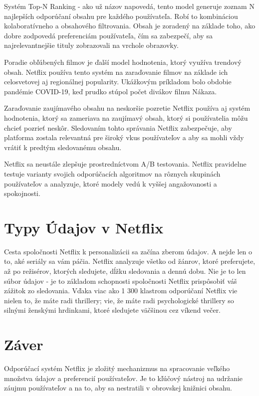 \documentclass[10pt,slovak,a4paper]{article}
\begin{document}
Systém Top-N Ranking - ako už názov napovedá, tento model generuje zoznam N najlepších odporúčaní obsahu pre každého používateľa. Robí to kombináciou kolaboratívneho a obsahového filtrovania. Obsah je zoradený na základe toho, ako dobre zodpovedá preferenciám používateľa, čím sa zabezpečí, aby sa najrelevantnejšie tituly zobrazovali na vrchole obrazovky.\cite{Top}


Poradie obľúbených filmov je ďalší model hodnotenia, ktorý využíva trendový obsah. Netflix používa tento systém na zaraďovanie filmov na základe ich celosvetovej aj regionálnej popularity. Ukážkovým príkladom bolo obdobie pandémie COVID-19, keď prudko stúpol počet divákov filmu Nákaza.\cite{Top} 


Zaraďovanie zaujímavého obsahu na neskoršie pozretie
Netflix používa aj systém hodnotenia, ktorý sa zameriava na zaujímavý obsah, ktorý si používatelia môžu chcieť pozrieť neskôr. Sledovaním tohto správania Netflix zabezpečuje, aby platforma zostala relevantná pre široký vkus používateľov a aby sa mohli vždy vrátiť k predtým sledovanému obsahu.\cite{Top}\cite{Ranking:System}


Netflix sa neustále zlepšuje prostredníctvom A/B testovania. Netflix pravidelne testuje varianty svojich odporúčacích algoritmov na rôznych skupinách používateľov a analyzuje, ktoré modely vedú k vyššej angažovanosti a spokojnosti.\cite{Ranking:System}

\section{Typy Údajov v Netflix}
Cesta spoločnosti Netflix k personalizácii sa začína zberom údajov. A nejde len o to, aké seriály sa vám páčia. Netflix analyzuje všetko od žánrov, ktoré preferujete, až po režisérov, ktorých sledujete, dĺžku sledovania a dennú dobu. Nie je to len súbor údajov - je to základom schopnosti spoločnosti Netflix prispôsobiť váš zážitok zo sledovania. Vďaka viac ako 1 300 klastrom odporúčaní Netflix vie nielen to, že máte radi thrillery; vie, že máte radi psychologické thrillery so silnými ženskými hrdinkami, ktoré sledujete väčšinou cez víkend večer.\cite{Bennett}\cite{Data}

\section{Záver}
Odporúčací systém Netflix je zložitý mechanizmus na spracovanie veľkého množstva údajov a preferencií používateľov. Je to kľúčový nástroj na udržanie záujmu používateľov a na to, aby sa nestratili v obrovskej knižnici obsahu.



\end{document}
